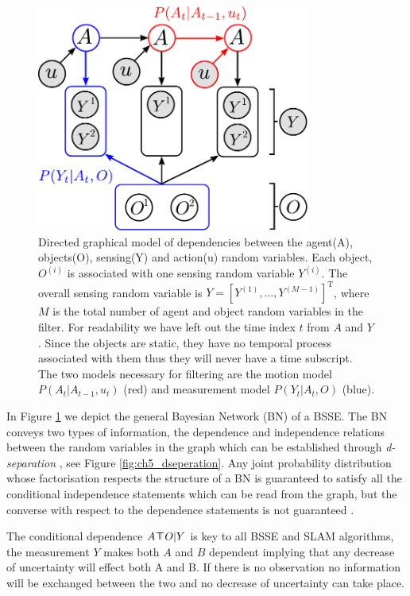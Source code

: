 \begin{figure}
\centering
\includegraphics[width=0.8\textwidth]{./ch5-MLMF/Figures/Figure2.pdf}
\caption{Directed graphical model of dependencies between the agent(A), objects(O), sensing(Y) and action(u) random variables. Each 
object, $O^{(i)}$ is associated with one sensing random variable $Y^{(i)}$. The overall sensing random variable is $Y = \left[Y^{(1)},\dots,Y^{(M-1)}\right]^{\mathrm{T}}$,
where $M$ is the total number of agent and object random variables in the filter. 
For readability we have left out the time index $t$ from $A$ and $Y$. Since the objects are static, they have no temporal process associated with 
them thus they will never have a time subscript. The two models necessary for filtering are the motion model $P(A_t|A_{t-1},u_t)$ (red) and measurement model
$P(Y_t|A_t,O)$ (blue).}
\label{fig:bayesian_sse_dag}
\end{figure}

In Figure \ref{fig:bayesian_sse_dag} we depict the general Bayesian Network (BN) of a BSSE. The BN conveys two types of
information, the dependence and independence relations between the random variables in the graph which can be established
through \textit{d-separation} \cite{BayesBall}, see Figure \ref{fig:ch5_dseperation}. Any joint probability distribution 
whose factorisation  respects the structure of a BN is guaranteed to satisfy all the conditional independence 
statements which can be read from the graph, but the converse with respect to the dependence statements is 
not guaranteed \cite[p.43]{barberBRML2012}. 

The conditional dependence $A \dependent O | Y$ is key to all BSSE and SLAM algorithms, the measurement $Y$ makes both $A$ and $B$
dependent implying that any decrease of uncertainty will effect both A and B. If there is no observation no information will be 
exchanged between the two and no decrease of uncertainty can take place.

